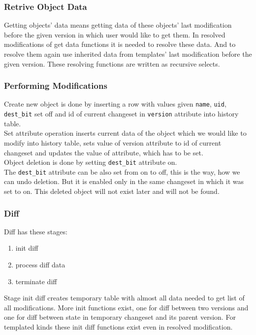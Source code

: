 \documentclass[deska]{subfiles}
\begin{document}
\subsubsection{Retrive Object Data}
Getting objects' data means getting data of these objects' last modification before the given version in which user would like to get them.
In resolved modifications of get data functions it is needed to resolve these data. And to resolve them again use inherited data from templates' last modification before the given version.
These resolving functions are written as recursive selects.

\subsubsection{Performing Modifications}
Create new object is done by inserting a row with values given {\tt name}, {\tt uid}, {\tt dest\_bit} set off and id of current changeset in {\tt version} attribute into history table.\\
Set attribute operation inserts current data of the object which we would like to modify into history table, sets value of version attribute to id of current changeset and updates the value of attribute, which has to be set.\\
Object deletion is done by setting {\tt dest\_bit} attribute on.\\
The {\tt dest\_bit} attribute can be also set from on to off, this is the way, how we can undo deletion. But it is enabled only in the same changeset in which it was set to on. This deleted object will not exist later and will not be found.

\subsubsection{Diff}

Diff has these stages:
\begin{enumerate}
    \item init diff
    \item process diff data
    \item terminate diff
\end{enumerate}
Stage init diff creates temporary table with almost all data needed to get list of all modifications.
More init functions exist, one for diff between two versions and one for diff between state in temporary changeset and its parent version. For templated kinds these init diff functions exist even in resolved modification.\\
\end{document}
